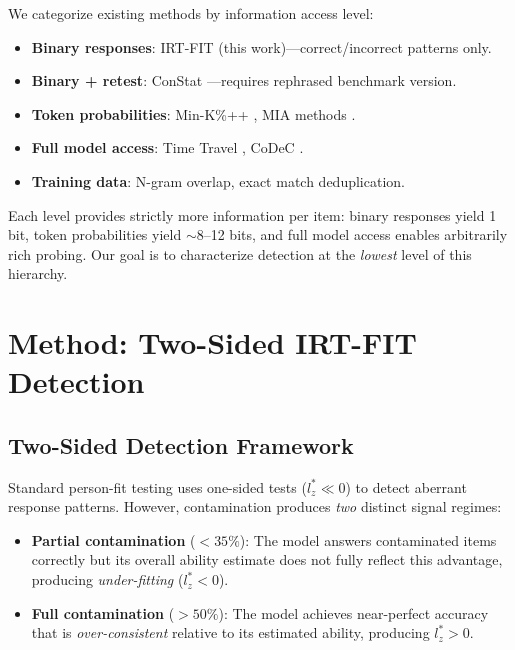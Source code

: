 \documentclass[11pt,a4paper]{article}
\begin{document}
We categorize existing methods by information access level:
\begin{itemize}
    \item \textbf{Binary responses}: IRT-FIT (this work)---correct/incorrect patterns only.
    \item \textbf{Binary + retest}: ConStat \citep{dekoninck2024constat}---requires rephrased benchmark version.
    \item \textbf{Token probabilities}: Min-K\%++ \citep{zhang2024minkpp}, MIA methods \citep{shi2024mia}.
    \item \textbf{Full model access}: Time Travel \citep{oren2024timetravelprobe}, CoDeC \citep{codec2026}.
    \item \textbf{Training data}: N-gram overlap, exact match deduplication.
\end{itemize}
Each level provides strictly more information per item: binary responses yield 1 bit, token probabilities yield $\sim$8--12 bits, and full model access enables arbitrarily rich probing. Our goal is to characterize detection at the \emph{lowest} level of this hierarchy.

\section{Method: Two-Sided IRT-FIT Detection}
\label{sec:method}

\subsection{Two-Sided Detection Framework}

Standard person-fit testing uses one-sided tests ($l_z^* \ll 0$) to detect aberrant response patterns. However, contamination produces \emph{two} distinct signal regimes:
\begin{itemize}
    \item \textbf{Partial contamination} ($< 35\%$): The model answers contaminated items correctly but its overall ability estimate does not fully reflect this advantage, producing \emph{under-fitting} ($l_z^* < 0$).
    \item \textbf{Full contamination} ($> 50\%$): The model achieves near-perfect accuracy that is \emph{over-consistent} relative to its estimated ability, producing $l_z^* > 0$.
\end{itemize}
\end{document}

